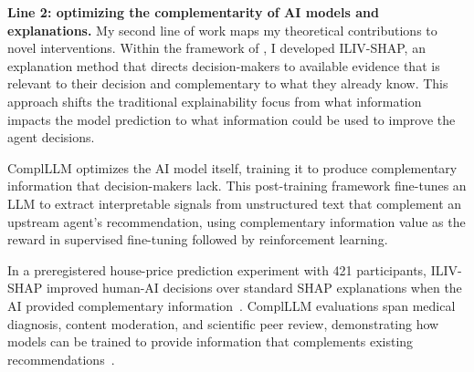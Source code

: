 \textbf{Line 2: optimizing the complementarity of AI models and explanations.}
My second line of work maps my theoretical contributions to novel interventions. 
Within the framework of \cite{guo2026value}, I developed ILIV-SHAP, an explanation method that directs decision-makers to available evidence that is relevant to their decision and complementary to what they already know.
This approach shifts the traditional explainability focus from what information impacts the model prediction to what information could be used to improve the agent decisions.
 
ComplLLM \citep{guo2026complllm} optimizes the AI model itself, training it to produce complementary information that decision-makers lack.
This post-training framework fine-tunes an LLM to extract interpretable signals from unstructured text that complement an upstream agent's recommendation, using complementary information value as the reward in supervised fine-tuning followed by reinforcement learning. 

In a preregistered house-price prediction experiment with 421 participants, ILIV-SHAP improved human-AI decisions over standard SHAP explanations when the AI provided complementary information~\citep{guo2026value}.
ComplLLM evaluations span medical diagnosis, content moderation, and scientific peer review, demonstrating how models can be trained to provide information that complements existing recommendations~\citep{guo2026complllm}.
